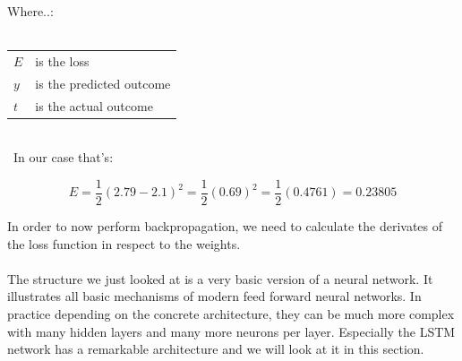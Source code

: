 \documentclass[a4paper,12pt]{report}
\begin{document}
\noindent
Where..:\\\\
\medskip
\begin{tabular}{@{}l@{\,--\,}l}
  $E$         \hspace*{2em} & \hspace*{2em} is the loss \\
  $y$         \hspace*{2em} & \hspace*{2em} is the predicted outcome \\
  $t$         \hspace*{2em} & \hspace*{2em} is the actual outcome \\
\end{tabular}\\
\
In our case that’s:

\[
E = \frac{1}{2}(2.79 - 2.1)^2 = \frac{1}{2}(0.69)^2 = \frac{1}{2}(0.4761) = 0.23805
\]

In order to now perform backpropagation, we need to calculate the derivates of the loss function in respect to the weights.\\\\
	
	
	
	
	
	
	
	
	
	
	
	
	
	
	
	
	
	
	
	
	
	
	
	
	
	
	
	
	
	
	
	

The structure we just looked at is a very basic version of a neural network. It illustrates all basic mechanisms of modern feed forward neural networks. In practice depending on the concrete architecture, they can be much more complex with many hidden layers and many more neurons per layer. Especially the LSTM network has a remarkable architecture and we will look at it in this section.
	
\end{document}
